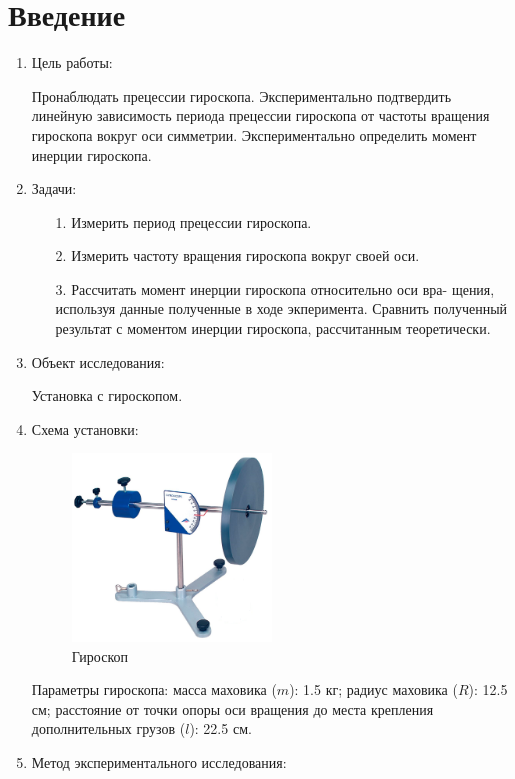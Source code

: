 \documentclass[12pt, a4paper]{article}
\begin{document}
\section{Введение}
\begin{enumerate}
\item Цель работы:

Пронаблюдать прецессии гироскопа. Экспериментально подтвердить линейную зависимость периода прецессии гироскопа от частоты вращения гироскопа вокруг оси симметрии. Экспериментально определить момент инерции гироскопа.
\item Задачи:
	\begin{enumerate}
		\item[1.]  Измерить период прецессии гироскопа.
		\item[2.] Измерить частоту вращения гироскопа вокруг своей оси.
		\item[3.] Рассчитать момент инерции гироскопа относительно оси вра-
щения, используя данные полученные в ходе экперимента. Сравнить полученный результат с моментом инерции гироскопа, рассчитанным теоретически.
	\end{enumerate}
		
\item Объект исследования:

Установка с гироскопом.

\item Схема установки:
\begin{figure}[H]
\includegraphics[width=0.5\textwidth]{gyro.png}
\centering
\caption{Гироскоп}
\end{figure}

Параметры гироскопа: масса маховика ($m$): 1.5 кг; радиус маховика ($R$): 12.5 см; расстояние от точки опоры оси вращения до места крепления дополнительных грузов ($l$): 22.5 см. 

\item Метод экспериментального исследования:


\end{enumerate}
\end{document}
